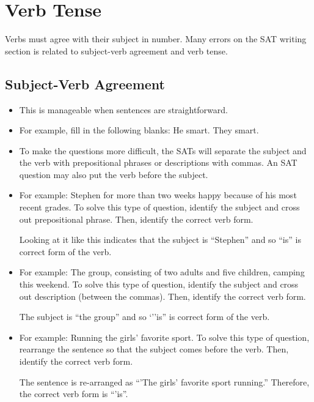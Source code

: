 \section{Verb Tense}

Verbs must agree with their subject in number. Many errors on the SAT writing section is related to subject-verb agreement and verb tense.
\subsection{Subject-Verb Agreement}

\begin{itemize}
\item{This is manageable when sentences are straightforward.}
\item{For example, fill in the following blanks: He \hrulefill smart. They \hrulefill smart.}
\item{To make the questions more difficult, the SATs will separate the subject and the verb with prepositional phrases or descriptions
with commas. An SAT question may also put
the verb before the subject.}
\item{For example: Stephen for more than two weeks \hrulefill happy because of his most recent grades. To solve
this type of question, identify the subject and cross out prepositional phrase. Then, identify
the correct verb form.}

\bigskip
Looking at it like this indicates that the subject is ``Stephen'' and so ``is'' is correct form of
the verb.

\item{For example: The group, consisting of two adults and five children, \hrulefill camping this weekend. To solve this type of question, identify the subject and cross out description (between the commas). Then, identify the correct verb form.}

\bigskip
The subject is ``the group'' and so `''is'' is correct form of the verb.

\item{For example: Running \hrulefill the girls' favorite sport. To solve this type of question, rearrange the sentence so that the subject comes before the verb. Then, identify the correct verb form.}

\bigskip
The sentence is re-arranged as ``'The girls' favorite sport \underline{\hspace{2in}} running.'' Therefore, the correct verb form is ``'is''.

\end{itemize}

